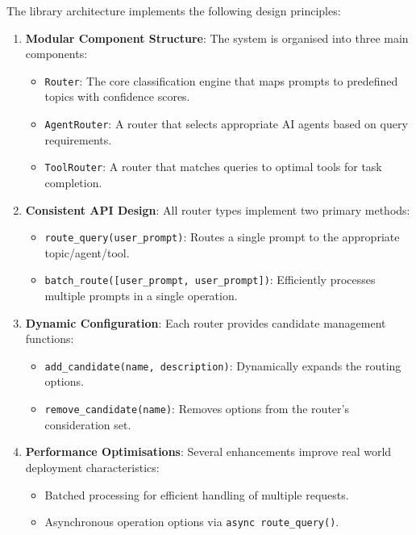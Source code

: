 The library architecture implements the following design principles:

\begin{enumerate}
    \item \textbf{Modular Component Structure}: The system is organised into three main components:
    \begin{itemize}
        \item \texttt{Router}: The core classification engine that maps prompts to predefined topics with confidence scores.
        \item \texttt{AgentRouter}: A router that selects appropriate AI agents based on query requirements.
        \item \texttt{ToolRouter}: A router that matches queries to optimal tools for task completion.
    \end{itemize}

    \item \textbf{Consistent API Design}: All router types implement two primary methods:
    \begin{itemize}
        \item \texttt{route\_query(user\_prompt)}: Routes a single prompt to the appropriate topic/agent/tool.
        \item \texttt{batch\_route([user\_prompt, user\_prompt])}: Efficiently processes multiple prompts in a single operation.
    \end{itemize}

    \item \textbf{Dynamic Configuration}: Each router provides candidate management functions:
    \begin{itemize}
        \item \texttt{add\_candidate(name, description)}: Dynamically expands the routing options.
        \item \texttt{remove\_candidate(name)}: Removes options from the router's consideration set.
    \end{itemize}

    \item \textbf{Performance Optimisations}: Several enhancements improve real world deployment characteristics:
    \begin{itemize}
        \item Batched processing for efficient handling of multiple requests.
        \item Asynchronous operation options via \texttt{async route\_query()}.
    \end{itemize}
\end{enumerate}

